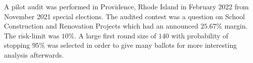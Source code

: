 A pilot audit was performed in Providence, Rhode Island in February 2022 from November 2021 special elections.
The audited contest was a question on School Construction and Renovation Projects which had an announced $25.67\%$ margin.
The risk-limit was $10\%$.
A large first round size of $140$ with probability of stopping $95\%$ was selected in order to give many ballots for more interesting analysis afterwards.
